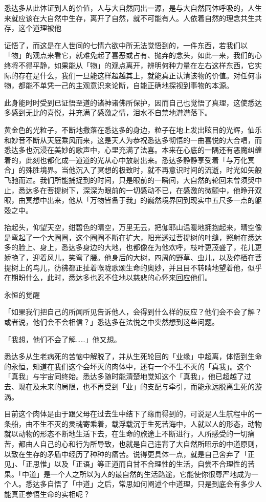 \documentclass[12pt,twoside,openany]{book}
\begin{document}
悉达多从此体证到人的价值，人与大自然同出一源，是与大自然同体呼吸的，人生来就应该在大自然中生存，离开了自然，就不可能有人。人依着自然的理念共生共存，这个道理被他





证悟了，而这是在人世间的七情六欲中所无法觉悟到的，一件东西，若我们以「物」的观点来看它，就难免起了喜恶或占有、抛弃的念头，如此一来，我们的心终将不得平静，如果能从「物」的观点离开，辨明何种力量在左右这样东西，它实际的存在是什么，我们一旦能这样超越其上，就能真正认清该物的价值。对任何事物，都能不单凭一己的主观意识来论断，自能正确地探视到事物的本源。

此身能时时受到已证悟至道的诸神诸佛所保护，因而自己也觉悟了真理，这使悉达多感到无比的喜悦，并充满了感激之情，泪水不自禁地潸潸落下。

黄金色的光粒子，不断地撒落在悉达多的身边，粒子在地上发出眩目的光辉，仙乐和妙音不断从天庭乘风而来，这是天人为恭祝悉达多彻悟的一曲喜悦的大合唱，而悉达多也沉浸在美妙的歌声中，心里充满了法喜。本来在心底的一隅还有恶魔纠缠着的，此刻也都化成一道道的光从心中放射出来。悉达多静静享受着「与万化冥合」的殊胜境界。当他沉入了冥想的极致时，就不再意识时间的流逝，时光如矢般飞驰而过。我们所能捕捉到的时间，只是眼前的一瞬间，大自然的轮回未曾须臾中止，悉达多在菩提树下，深深为眼前的一切感动不已，在感激的微颤中，他睁开双眼，由冥想中出来，他从「万物皆备于我」的巍然境界回到现实中五尺多一点的躯殻之中。

抬起头，仰望天空，绀碧色的晴空，万里无云，把伽耶山温暖地拥抱起来，晴空像是弯起了一个大圈圈，这个圈圈不断在扩大，阳光透过菩提树的叶缝，照射在悉达多的脸上、身上，悉达多身边的大地，也都像在为他欢呼，枝叶更茂盛了，花儿更娇艳了，迎着风儿，笑弯了腰。他身后的大树，四周的野草、虫儿，以及停栖在菩提树上的鸟儿，彷彿都正扯着喉咙歌颂生命的奥妙，并且目不转睛地望着他，似乎在期盼什么，此时，悉达多也忍不住地以慈悲的心怀来回应他们。

永恒的觉醒

「如果我们把自己的所闻所见告诉他人，会得到什么样的反应？他们会不会了解？或者说，他们会不会相信？」悉达多在法悦之中突然想到这些问题。

「我想，他们不会了解……」他又想。

悉达多从生老病死的苦恼中解脱了，并从生死轮回的「业缘」中超离，体悟到生命的永恒，知道在我们这个会坏灭的肉体中，还有一个不生不灭的「真我」。这个「真我」与宇宙同终始。悉达多随时能清楚地觉知这个「真我」，他已超越了过去、现在及未来的局限，也不再受到「业」的支配与牵引，而能永远脱离生死的漩涡。

目前这个肉体是由于跟父母在过去生中结下了缘而得到的，可说是人生航程中的一条船，由不生不灭的灵魂寄乘着，载浮载沉于生死苦海中，人就以人的形态，动物就以动物的形态不断地生活下去，在生命的旅途上不断进行，人所感受的一切痛苦，都由人自己的心和行为所导致，也就是自己违背了大自然所昭示的中道原则，以致在生存的矛盾中经历了种种的痛苦。说得更具体一点，就是自己舍弃了「正见」、「正思惟」以及「正语」等正道而自甘不合理性的生活，自尝不合理性的苦果。「中道」是一个人之所以为人的最自然的生活路途，它能使你很尊严地成为一个人。悉达多自悟了「中道」之后，常思如何阐述个中道理，只是到底会有多少人能真正参悟生命的实相呢？
\end{document}
